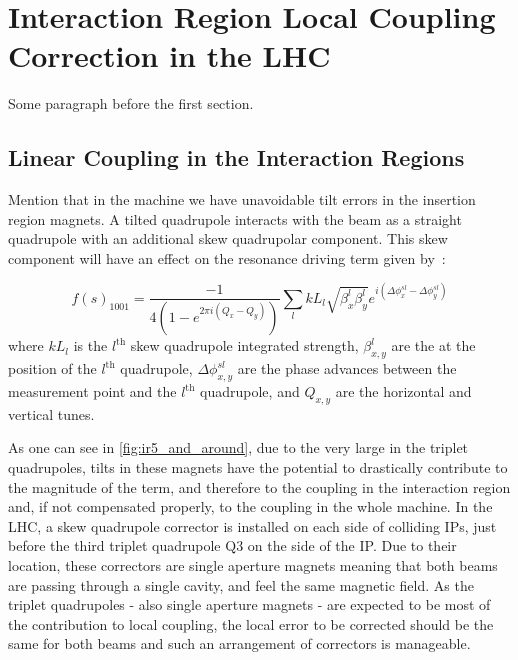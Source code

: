 
\chapter{Interaction Region Local Coupling Correction in the LHC} %

\label{Chapter3} %


Some paragraph before the first section.


\section{Linear Coupling in the Interaction Regions}

Mention that in the machine we have unavoidable tilt errors in the insertion region magnets.
A tilted quadrupole interacts with the beam as a straight quadrupole with an additional skew quadrupolar component.
This skew component will have an effect on the \foneohone resonance driving term given by~\cite{PRAB:Calaga:MergingHamiltonianMatrixApproches}:

\begin{equation}
    f(s)_{1001} = \frac{-1}{4\left(1-e^{2 \pi i\left(Q_x-Q_y\right)}\right)} \sum_l k L_l \sqrt{\beta_x^l \beta_y^l} e^{i\left(\Delta \phi_x^{s l}-\Delta \phi_y^{s l}\right)}
    \label{eq:skew_quad_contribution_to_f1001}
\end{equation}
where \(k L_l\) is the \(l^{\mathrm{th}}\) skew quadrupole integrated strength, \(\beta^l_{x,y}\) are the \betafunctions at the position of the \(l^{\mathrm{th}}\) quadrupole, \(\Delta \phi^{sl}_{x,y}\) are the phase advances between the measurement point and the \(l^{\mathrm{th}}\) quadrupole, and \(Q_{x,y}\) are the horizontal and vertical tunes.

As one can see in \cref{fig:ir5_and_around}, due to the very large \betafunctions in the triplet quadrupoles, tilts in these magnets have the potential to drastically contribute to the magnitude of the \foneohone term, and therefore to the coupling in the interaction region and, if not compensated properly, to the coupling in the whole machine.
In the LHC, a skew quadrupole corrector is installed on each side of colliding IPs, just before the third triplet quadrupole \(\mathrm{Q3}\) on the side of the IP.
Due to their location, these correctors are single aperture magnets meaning that both beams are passing through a single cavity, and feel the same magnetic field.
As the triplet quadrupoles - also single aperture magnets - are expected to be most of the contribution to local coupling, the local error to be corrected should be the same for both beams and such an arrangement of correctors is manageable.

